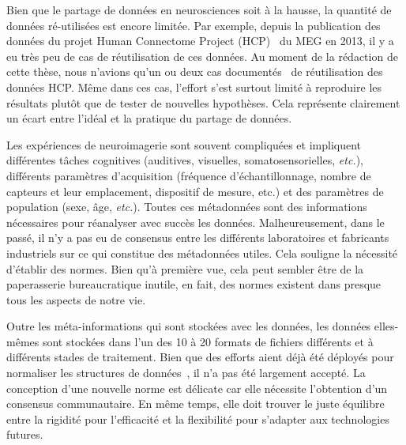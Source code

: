 Bien que le partage de données en neurosciences soit à la hausse, la quantité de données ré-utilisées est encore limitée. Par exemple, depuis la publication des données du projet Human Connectome Project (HCP)~\citep{larson2013adding} du MEG en 2013, il y a eu très peu de cas de réutilisation de ces données. Au moment de la rédaction de cette thèse, nous n'avions qu'un ou deux cas documentés~\citep{jas2017autoreject} de réutilisation des données HCP. Même dans ces cas, l'effort s'est surtout limité à reproduire les résultats plutôt que de tester de nouvelles hypothèses. Cela représente clairement un écart entre l'idéal et la pratique du partage de données.


Les expériences de neuroimagerie sont souvent compliquées et impliquent différentes tâches cognitives (auditives, visuelles, somatosensorielles, \emph{etc.}), différents paramètres d'acquisition (fréquence d'échantillonnage, nombre de capteurs et leur emplacement, dispositif de mesure, etc.) et des paramètres de population (sexe, âge, \emph{etc.}). Toutes ces métadonnées sont des informations nécessaires pour réanalyser avec succès les données. Malheureusement, dans le passé, il n'y a pas eu de consensus entre les différents laboratoires et fabricants industriels sur ce qui constitue des métadonnées utiles. Cela souligne la nécessité d'établir des normes. Bien qu'à première vue, cela peut sembler être de la paperasserie bureaucratique inutile, en fait, des normes existent dans presque tous les aspects de notre vie.


Outre les méta-informations qui sont stockées avec les données, les données elles-mêmes sont stockées dans l'un des 10 à 20 formats de fichiers différents et à différents stades de traitement. Bien que des efforts aient déjà été déployés pour normaliser les structures de données~\citep{gibson2009minimum, grewe2011bottom, stoewer2013singlefile, teeters2015neurodata, bigdely2016preparing}, il n'a pas été largement accepté. La conception d'une nouvelle norme est délicate car elle nécessite l'obtention d'un consensus communautaire. En même temps, elle doit trouver le juste équilibre entre la rigidité pour l'efficacité et la flexibilité pour s'adapter aux technologies futures.

